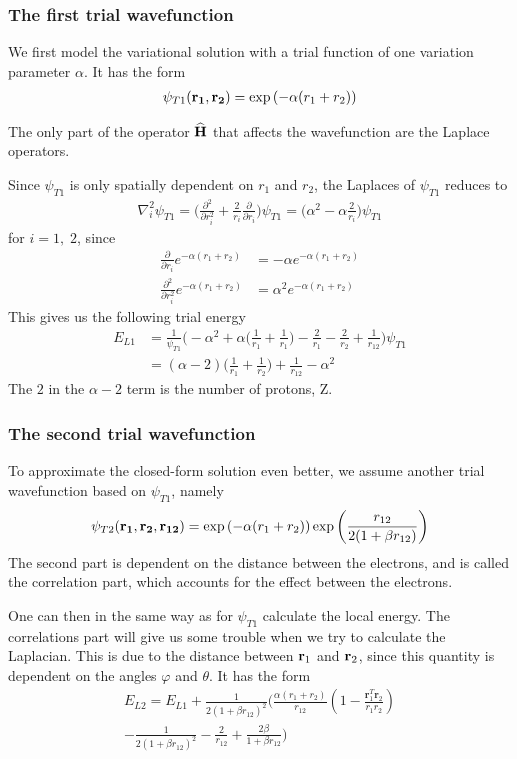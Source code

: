 \documentclass[twocolumn]{article}[12pt]
\newcommand{\eq}[1]{\begin{align*}#1\end{align*}}
\renewcommand\vec[1]{{\bf #1}}
\newcommand{\OP}[1]{{\bf\widehat{#1}}}
\begin{document}
\subsubsection{The first trial wavefunction}
We first model the variational solution with a trial function of one
variation parameter $\alpha$. It has the form
{\small
\eq{
\psi_{T1}({\bf r_1},{\bf r_2}) = 
   \exp{\left(-\alpha(r_1+r_2)\right)}
}}%

The only part of the operator $\OP H$ that affects the wavefunction
are the Laplace operators.

Since $\psi_{T1}$ is only spatially dependent on $r_1$ and $r_2$,
the Laplaces of $\psi_{T1}$ reduces to
{\small
\eq{
  \nabla_i^2 \psi_{T1} = \bigg( \frac{\partial^2}{\partial r_i^2} 
    + \frac{2}{r_i} \frac{\partial}{\partial r_i} \bigg) \psi_{T1}
    = \bigg( \alpha^2 -\alpha\frac{2}{r_i}  \bigg)\psi_{T1}
}}%
for $i = 1,\;2$, since
{\small
\eq{
  \frac{\partial}{\partial r_i} e^{-\alpha (r_1+r_2)}
    &= -\alpha e^{-\alpha (r_1+r_2)}\\
\frac{\partial^2}{\partial r_i^2} e^{-\alpha (r_1+r_2)}
    &= \alpha^2 e^{-\alpha (r_1+r_2)}
}}%
This gives us the following trial energy
{\small
\eq{
  E_{L1}&=\frac{1}{\psi_{T1}}\bigg( -\alpha^2 
  +\alpha\bigg( \frac{1}{r_1}+\frac{1}{r_1}  \bigg)
    -\frac{2}{r_1}-\frac{2}{r_2} + \frac{1}{r_{12}}
    \bigg)\psi_{T1}\\
  &=(\alpha-2)\bigg( \frac{1}{r_1}+\frac{1}{r_2} \bigg)
    +\frac{1}{r_{12}}-\alpha^2
}}%
The $2$ in the $\alpha-2$ term is the number of protons, Z.

\subsubsection{The second trial wavefunction}
To approximate the closed-form solution even better,
we assume another trial wavefunction based on $\psi_{T1}$, namely
{\small
\eq{
  \psi_{T2} ({\bf r_1},{\bf r_2}, {\bf r_{12}})
    =\exp{\left(-\alpha(r_1+r_2)\right)}
    \exp{\left(\frac{r_{12}}{2(1+\beta r_{12})}\right)}
}}%
The second part is dependent on the distance between the
electrons, and is called the correlation part,
which accounts for the effect between the electrons.

One can then in the same way as for $\psi_{T1}$ calculate
the local energy. The correlations part will give us some trouble
when we try to calculate the Laplacian. This is due to
the distance between $\vec r_1$ and $\vec r_2$, since this quantity
is dependent on the angles $\varphi$ and $\theta$.
It has the form
{\small
\eq{
	E_{L2} = E_{L1}+\frac{1}{2(1+\beta r_{12})^2}
	\bigg(\frac{\alpha(r_1+r_2)}{r_{12}}(1-
	\frac{\mathbf{r}_1^T\mathbf{r}_2}{r_1r_2})\\
	-\frac{1}{2(1+\beta r_{12})^2}-\frac{2}{r_{12}}+
	\frac{2\beta}{1+\beta r_{12}}\bigg)
}}%
\end{document}
